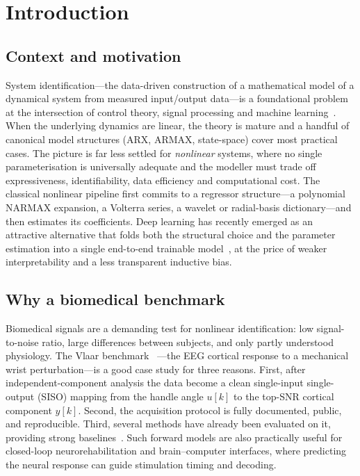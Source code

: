 \documentclass[10pt,twocolumn,letterpaper]{article}
\begin{document}
\section{Introduction}

\subsection{Context and motivation}
System identification---the data-driven construction of a mathematical
model of a dynamical system from measured input/output data---is a
foundational problem at the intersection of control theory, signal
processing and machine learning~\cite{CourseMaterial}.
When the underlying dynamics are linear, the theory is mature and a
handful of canonical model structures (ARX, ARMAX, state-space) cover
most practical cases. The picture is far less settled for
\emph{nonlinear} systems, where no single parameterisation is
universally adequate and the modeller must trade off expressiveness,
identifiability, data efficiency and computational cost. The classical
nonlinear pipeline first commits to a regressor structure---a polynomial
NARMAX expansion, a Volterra series, a wavelet or radial-basis
dictionary---and then estimates its coefficients. Deep learning has
recently emerged as an attractive alternative that folds both the
structural choice and the parameter estimation into a single end-to-end
trainable model~\cite{CourseMaterial}, at the price of
weaker interpretability and a less transparent inductive bias.

\subsection{Why a biomedical benchmark}
Biomedical signals are a demanding test for nonlinear identification: low
signal-to-noise ratio, large differences between subjects, and only
partly understood physiology. The Vlaar \etal benchmark~\cite{Vlaar2018}
---the EEG cortical response to a mechanical wrist perturbation---is a
good case study for three reasons. First, after independent-component
analysis the data become a clean single-input single-output (SISO)
mapping from the handle angle $u[k]$ to the top-SNR cortical component
$y[k]$. Second, the acquisition protocol is fully documented, public, and
reproducible. Third, several methods have already been evaluated on it,
providing strong baselines~\cite{Vlaar2018,Gu2018,Gu2021,Santos2023}.
Such forward models are also practically useful for closed-loop
neurorehabilitation and brain--computer interfaces, where predicting the
neural response can guide stimulation timing and decoding.
\end{document}

